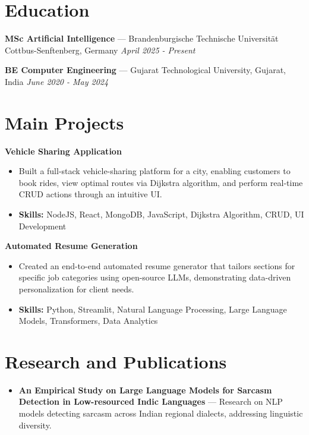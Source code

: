 \documentclass[a4paper,10pt]{article}
\begin{document}
\section*{Education}
\textbf{MSc Artificial Intelligence} — Brandenburgische Technische Universität Cottbus-Senftenberg, Germany \hfill \textit{April 2025 - Present}\par
\vspace{1.5pt}
\textbf{BE Computer Engineering} — Gujarat Technological University, Gujarat, India \hfill \textit{June 2020 - May 2024}\par

\section*{Main Projects}
\textbf{Vehicle Sharing Application}\par
\vspace{1pt}
\begin{itemize}
  \item Built a full-stack vehicle-sharing platform for a city, enabling customers to book rides, view optimal routes via Dijkstra algorithm, and perform real-time CRUD actions through an intuitive UI.
  \item \textbf{Skills:} NodeJS, React, MongoDB, JavaScript, Dijkstra Algorithm, CRUD, UI Development
\end{itemize}
\vspace{3pt}
\textbf{Automated Resume Generation}\par
\vspace{1pt}
\begin{itemize}
  \item Created an end-to-end automated resume generator that tailors sections for specific job categories using open-source LLMs, demonstrating data-driven personalization for client needs.
  \item \textbf{Skills:} Python, Streamlit, Natural Language Processing, Large Language Models, Transformers, Data Analytics
\end{itemize}

\section*{Research and Publications}
\begin{itemize}
\item \textbf{An Empirical Study on Large Language Models for Sarcasm Detection in Low-resourced Indic Languages} — Research on NLP models detecting sarcasm across Indian regional dialects, addressing linguistic diversity.
\end{itemize}
\end{document}

